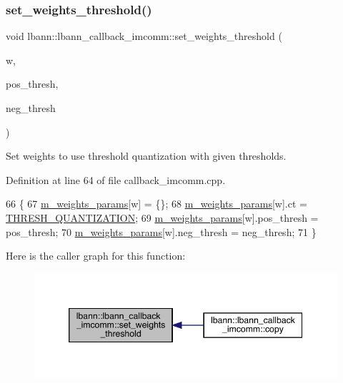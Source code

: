 \subsubsection{\texorpdfstring{set\+\_\+weights\+\_\+threshold()}{set\_weights\_threshold()}}
{\footnotesize\ttfamily void lbann\+::lbann\+\_\+callback\+\_\+imcomm\+::set\+\_\+weights\+\_\+threshold (\begin{DoxyParamCaption}\item[{\hyperlink{classlbann_1_1weights}{weights} $\ast$}]{w,  }\item[{Data\+Type}]{pos\+\_\+thresh,  }\item[{Data\+Type}]{neg\+\_\+thresh }\end{DoxyParamCaption})}

Set weights to use threshold quantization with given thresholds. 

Definition at line 64 of file callback\+\_\+imcomm.\+cpp.


\begin{DoxyCode}
66                                                                        \{
67   \hyperlink{classlbann_1_1lbann__callback__imcomm_a32a0319c91aff324cb3468de4f31dd50}{m\_weights\_params}[w] = \{\};
68   \hyperlink{classlbann_1_1lbann__callback__imcomm_a32a0319c91aff324cb3468de4f31dd50}{m\_weights\_params}[w].ct = \hyperlink{classlbann_1_1lbann__callback__imcomm_acf7e894b3381e7f9b71020dc73594d6aa76420a96a3df1d5b60140bab6bc32dc4}{THRESH\_QUANTIZATION};
69   \hyperlink{classlbann_1_1lbann__callback__imcomm_a32a0319c91aff324cb3468de4f31dd50}{m\_weights\_params}[w].pos\_thresh = pos\_thresh;
70   \hyperlink{classlbann_1_1lbann__callback__imcomm_a32a0319c91aff324cb3468de4f31dd50}{m\_weights\_params}[w].neg\_thresh = neg\_thresh;
71 \}
\end{DoxyCode}
Here is the caller graph for this function\+:\nopagebreak
\begin{figure}[H]
\begin{center}
\leavevmode
\includegraphics[width=346pt]{classlbann_1_1lbann__callback__imcomm_acf71333f73d26714217ffcd93aa31830_icgraph}
\end{center}
\end{figure}
\mbox{\label{classlbann_1_1lbann__callback__imcomm_a096555a87ce1bb011ceafb44081c4192}} 

